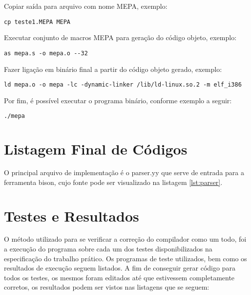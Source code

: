 \documentclass[12pt,a4paper]{article}
\begin{document}
Copiar saída para arquivo com nome MEPA, exemplo:
\begin{verbatim}
cp teste1.MEPA MEPA
\end{verbatim}
Executar conjunto de macros MEPA para geração do código objeto, exemplo:
\begin{verbatim}
as mepa.s -o mepa.o --32
\end{verbatim}
Fazer ligação em binário final a partir do código objeto gerado, exemplo:
\begin{verbatim}
ld mepa.o -o mepa -lc -dynamic-linker /lib/ld-linux.so.2 -m elf_i386
\end{verbatim}
Por fim, é possível executar o programa binário, conforme exemplo a seguir:
\begin{verbatim}
./mepa
\end{verbatim}


\section{Listagem Final de Códigos} \label{listagem}

O principal arquivo de implementação é o parser.yy que serve de entrada para a ferramenta bison, cujo fonte pode ser visualizado na listagem \ref{lst:parser}.




\section{Testes e Resultados}

O método utilizado para se verificar a correção do compilador como um todo, foi a execução do programa sobre cada um dos testes disponibilizados na especificação do trabalho prático. Os programas de teste utilizados, bem como os resultados de execução seguem listados. A fim de conseguir gerar código para todos os testes, os mesmos foram editados até que estivessem completamente corretos, os resultados podem ser vistos nas listagens que se seguem:







\end{document}
